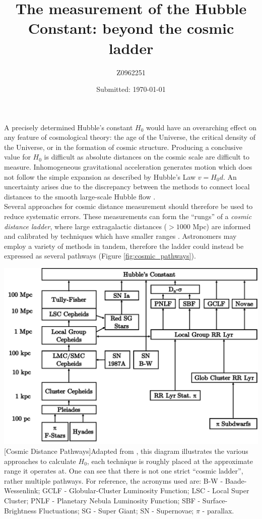 \documentclass[12pt, onecolumn]{revtex4}    %
\begin{document}
                     


\title{The measurement of the Hubble Constant: beyond the cosmic ladder} 
\date{Submitted: \today{}}
\author{Z0962251}

\maketitle
\thispagestyle{plain} %

A precisely determined Hubble's constant $H_0$ would have an overarching effect on any feature of cosmological theory: the age of the Universe, the critical density of the Universe, or in the formation of cosmic structure. Producing a conclusive value for $H_0$ is difficult as absolute distances on the cosmic scale are difficult to measure. Inhomogeneous gravitational acceleration generates motion which does not follow the simple expansion as described by Hubble's Law $v=H_0 d$. An uncertainty arises due to the discrepancy between the methods to connect local distances to the smooth large-scale Hubble flow \citep{fukugita_cosmic}. \\

Several approaches for cosmic distance measurement should therefore be used to reduce systematic errors. These measurements can form the ``rungs'' of a \textit{cosmic distance ladder}, where large extragalactic distances ($>1000$ Mpc) are informed and calibrated by techniques which have smaller ranges \citep{carroll_astro}. Astronomers may employ a variety of methods in tandem, therefore the ladder could instead be expressed as several pathways (Figure \ref{fig:cosmic_pathways}). 


\begin{center}
\includegraphics[width=0.8\linewidth]{figures/cosmic_distance_pathways}
[Cosmic Distance Pathways]{Adapted from \cite{jacoby_extragal}, this diagram illustrates the various approaches to calculate $H_0$, each technique is roughly placed at the approximate range it operates at. One can see that there is not one strict ``cosmic ladder'', rather multiple pathways. For reference, the acronyms used are: B-W - Baade-Wessenlink; GCLF - Globular-Cluster Luminosity Function; LSC - Local Super Cluster; PNLF - Planetary Nebula Luminosity Function; SBF - Surface-Brightness Fluctuations; SG - Super Giant; SN - Supernovae; $\pi$ - parallax.}
\label{fig:cosmic_pathways}
\end{center}
\end{document}
